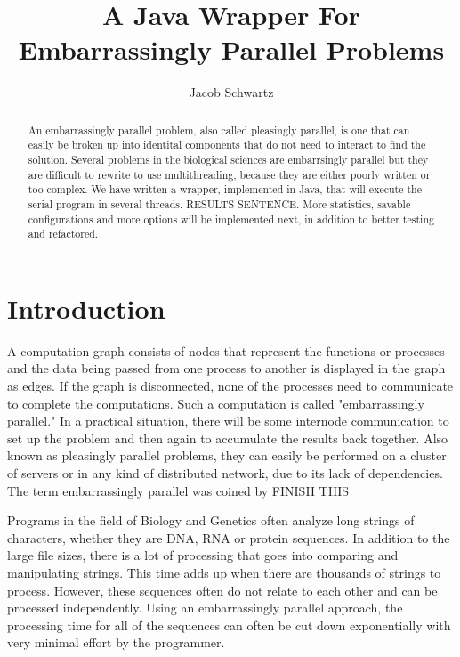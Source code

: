 \documentclass[12pt]{article}
\begin{document}
\title{A Java Wrapper For Embarrassingly Parallel Problems}
\author{Jacob Schwartz}
\maketitle

\begin{abstract}
An embarrassingly parallel problem, also called pleasingly parallel, is one that 
can easily be broken up into identital components that do not need to interact 
to find the solution. Several problems in the biological sciences are 
embarrsingly parallel but they are difficult to rewrite to use multithreading, 
because they are either poorly written or too complex. We have written a 
wrapper, implemented in Java, that will execute the serial program in several 
threads. RESULTS SENTENCE. More
statistics, savable configurations and more options will be implemented next, in
addition to better testing and refactored.
\end{abstract}

\section{Introduction}

A computation graph consists of nodes that represent the functions or processes 
and the data being passed from one process to another is displayed in the graph 
as edges. If the graph is disconnected, none of the processes need to 
communicate to complete the computations. Such a computation is called
"embarrassingly parallel." In a practical situation, there will be some 
internode communication to set up the problem and then again to accumulate the 
results back together. Also known as pleasingly parallel problems, they can 
easily be performed on a cluster of servers or in any kind of distributed 
network, due to its lack of dependencies. The term  embarrassingly parallel was 
coined by FINISH THIS 

Programs in the field of Biology and Genetics often analyze long strings of
characters, whether they are DNA, RNA or protein sequences. In addition to the
large file sizes, there is a lot of processing that goes into comparing and
manipulating strings. This time adds up when there are thousands of strings to 
process. However, these sequences often do not relate to each other and can be 
processed independently. Using an embarrassingly parallel approach, the 
processing time for all of the sequences can often be cut down exponentially 
with very minimal effort by the programmer.
\end{document}
